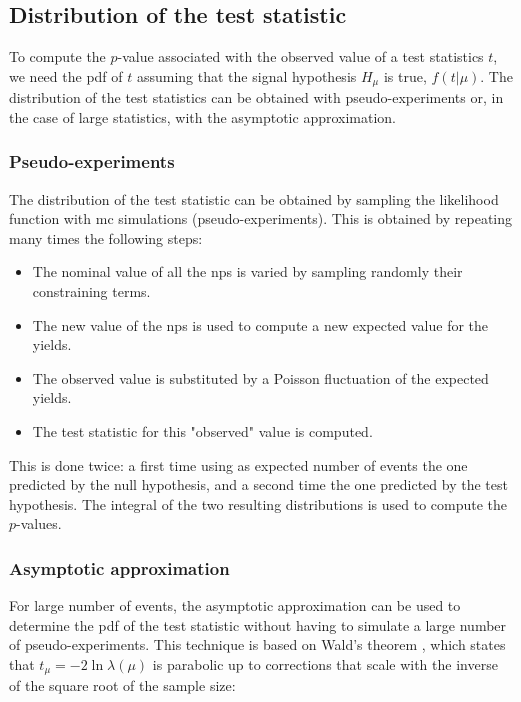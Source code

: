\subsection{Distribution of the test statistic}

To compute the $p$-value associated with the observed value of a test statistics $t$, we need the \gls{pdf} of $t$ assuming that the signal hypothesis $H_\mu$ is true, $ f(t | \mu ) $. The distribution of the test statistics can be obtained with pseudo-experiments or, in the case of large statistics, with the asymptotic approximation. 

\subsubsection*{Pseudo-experiments}

The distribution of the test statistic can be obtained by sampling the likelihood function with \gls{mc} simulations (pseudo-experiments). This is obtained by repeating many times the following steps:
\begin{itemize}
\item The nominal value of all the \glspl{np} is varied by sampling randomly their constraining terms.
\item The new value of the \glspl{np} is used to compute a new expected value for the yields.
\item The observed value is substituted by a Poisson fluctuation of the expected yields.
\item The test statistic for this "observed" value is computed.
\end{itemize}

This is done twice: a first time using as expected number of events the one predicted by the null hypothesis, and a second time the one predicted by the test hypothesis. The integral of the two resulting distributions is used to compute the $p$-values.

\subsubsection*{Asymptotic approximation}
For large number of events, the asymptotic approximation \cite{Cowan2011} can be used to determine the \gls{pdf} of the test statistic without having to simulate a large number of pseudo-experiments. This technique is based on  Wald's theorem \cite{Wald1943}, which states that $t_{\mu} = -2 \ln \lambda(\mu)$ is parabolic up to corrections that scale with the inverse of the square root of the sample size:

